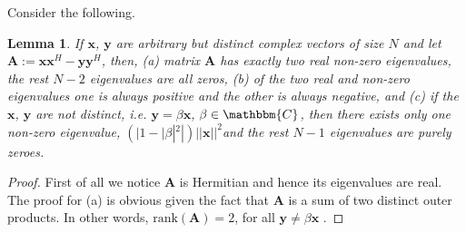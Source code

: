 \documentclass[11pt,draftclsnofoot,onecolumn]{IEEEtran}
\newtheorem{lem}{\bf {Lemma}}
\theoremstyle{definition}
\theoremstyle{remark}
\begin{document}
Consider the following.
\begin{lem} \label{lemma4}
If $\mathbf{x}$, $\mathbf{y}$ are arbitrary but distinct complex vectors of size $N$ and let $\mathbf{A}:=\mathbf{xx}^H-\mathbf{yy}^H$, then,
(a)  matrix $\mathbf{A}$ has exactly two real non-zero eigenvalues, the rest $N-2$ eigenvalues are all zeros,
(b) of the two real and non-zero eigenvalues one is always positive and the other is always negative, and 
(c) if the $\mathbf{x}$, $\mathbf{y}$ are not distinct, i.e. $\mathbf{y}=\beta \mathbf{x}$, $\beta\in\mathbbm{C}$, then there exists only one non-zero eigenvalue, $(|1-|\beta|^2|) ||\mathbf{x}||^2$and  the rest $N-1$ eigenvalues are purely zeroes.
\end{lem}
\begin{proof}
First of all we notice $\mathbf{A}$ is Hermitian and hence its eigenvalues are real. The proof for (a) is obvious given the fact that $\mathbf{A}$ is a sum of two distinct outer products. In other words, $\mathrm{rank}(\mathbf{A})=2$, for all $\mathbf{y}\neq\beta\mathbf{x}$ .


\end{proof}
\end{document}
